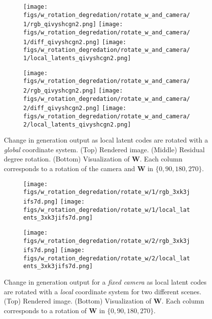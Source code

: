 \documentclass[10pt,twocolumn,letterpaper]{article}
\begin{document}
\begin{figure*}[h]
	\centering
	\begin{subfigure}{0.49\linewidth}
		\centering
		\texttt{[image: figs/w\_rotation\_degredation/rotate\_w\_and\_camera/1/rgb\_qivyshcgn2.png]}
		\texttt{[image: figs/w\_rotation\_degredation/rotate\_w\_and\_camera/1/diff\_qivyshcgn2.png]}
		\texttt{[image: figs/w\_rotation\_degredation/rotate\_w\_and\_camera/1/local\_latents\_qivyshcgn2.png]}
		
	\end{subfigure} \hfill
	\begin{subfigure}{0.49\linewidth}
		\centering
		\texttt{[image: figs/w\_rotation\_degredation/rotate\_w\_and\_camera/2/rgb\_qivyshcgn2.png]}
		\texttt{[image: figs/w\_rotation\_degredation/rotate\_w\_and\_camera/2/diff\_qivyshcgn2.png]}
		\texttt{[image: figs/w\_rotation\_degredation/rotate\_w\_and\_camera/2/local\_latents\_qivyshcgn2.png]}
	\end{subfigure}
	\caption{Change in generation output as local latent codes are rotated with a \textit{global} coordinate system. (Top) Rendered image. (Middle) Residual  degree rotation. (Bottom) Visualization of $\textbf{W}$. Each column corresponds to a rotation of the camera and $\textbf{W}$ in $\{0, 90, 180, 270\}$.}
	\label{fig:rotate_W_global_fix_camera}
\end{figure*}

\begin{figure*}[h]
	\centering
	\begin{subfigure}{0.49\linewidth}
		\centering
		\texttt{[image: figs/w\_rotation\_degredation/rotate\_w/1/rgb\_3xk3jifs7d.png]}
		\texttt{[image: figs/w\_rotation\_degredation/rotate\_w/1/local\_latents\_3xk3jifs7d.png]}
	\end{subfigure} \hfill
	\begin{subfigure}{0.49\linewidth}
		\centering
		\texttt{[image: figs/w\_rotation\_degredation/rotate\_w/2/rgb\_3xk3jifs7d.png]}
		\texttt{[image: figs/w\_rotation\_degredation/rotate\_w/2/local\_latents\_3xk3jifs7d.png]}
	\end{subfigure}
	\caption{Change in generation output for a \textit{fixed camera} as local latent codes are rotated with a \textit{local} coordinate system for two different scenes. (Top) Rendered image. (Bottom) Visualization of $\textbf{W}$. Each column corresponds to a rotation of $\textbf{W}$ in $\{0, 90, 180, 270\}$.}
	\label{fig:rotate_W_local}
\end{figure*}
\end{document}
